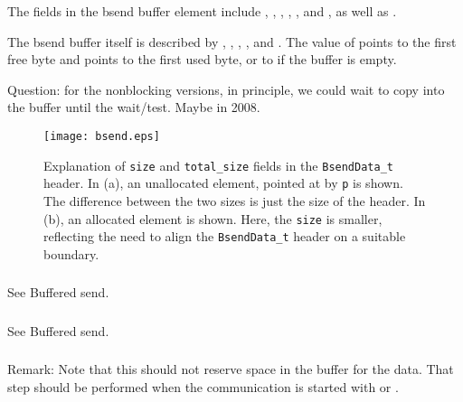 \documentclass{article}
\begin{document}
The fields in the bsend buffer element include
,
,
,
,
, and 
, as well as .

The bsend buffer itself is described by
, ,
, , and
.  The value of  points
to the first free byte and  points to the first used byte,
or to  if the buffer is empty.

Question: for the nonblocking versions, in principle, we could wait to
copy into the buffer until the wait/test.  Maybe in 2008.




\begin{figure}
\centerline{\texttt{[image: bsend.eps]}}
\caption{Explanation of \texttt{size} and \texttt{total_size} fields in the
\texttt{BsendData_t} header.  In (a), an unallocated element, pointed at by
\texttt{p} is shown.  The difference between the two sizes is just the size of
the header.  In (b), an allocated element is shown.  Here, the \texttt{size}
is smaller, reflecting the need to align the \texttt{BsendData_t} header on a
suitable boundary.}
\label{fig:bsend-buffers}
\end{figure}

\subsubsection{}
See Buffered send.

\subsubsection{}
See Buffered send.

\subsubsection{}
Remark:  Note that this should not reserve space in the buffer for the
data.  That step should be performed when the communication is started
with  or .
\end{document}
